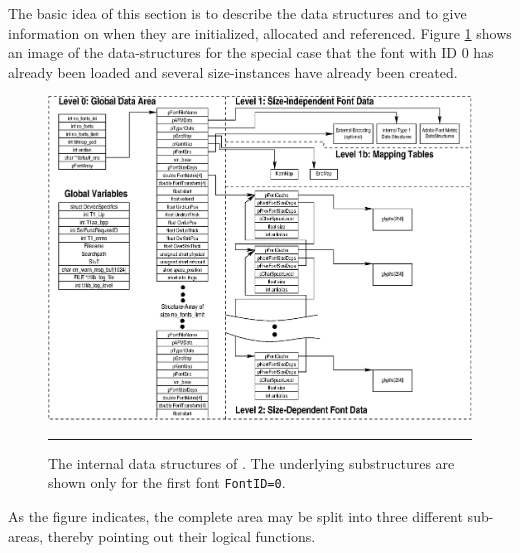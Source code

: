 The basic idea of this section is to describe the data structures and to give
information on when they are initialized, allocated and referenced. Figure
\ref{figure:t1data} shows an image of the data-structures for the special case that
the font with ID 0 has already been loaded and several size-instances have
already been created. 
\begin{figure}
\begin{center}
\includegraphics*[angle=90]{t1_data.eps}
\end{center}
\hrule\vskip3mm\small
\caption{\label{figure:t1data}The internal data structures of \tonelib. The
underlying substructures are shown only for the first font
{\tt FontID=0}.} 
\end{figure}
As the figure indicates, the complete area may be split into three
different sub-areas, thereby pointing out their logical functions.


